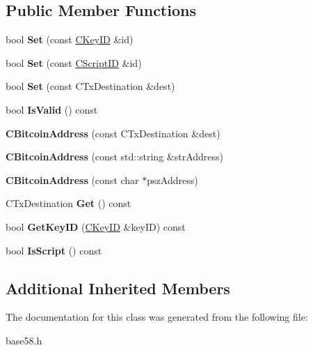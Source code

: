 \subsection*{Public Member Functions}
\begin{DoxyCompactItemize}
\item 
\mbox{\label{class_c_bitcoin_address_abe1614f9ecd143ae69256d65c5edbcab}} 
bool {\bfseries Set} (const \mbox{\hyperlink{class_c_key_i_d}{C\+Key\+ID}} \&id)
\item 
\mbox{\label{class_c_bitcoin_address_abb974c40304444b0f14a005ddb7dac03}} 
bool {\bfseries Set} (const \mbox{\hyperlink{class_c_script_i_d}{C\+Script\+ID}} \&id)
\item 
\mbox{\label{class_c_bitcoin_address_a819dfc6a4866832e2cd2e51c1a245d80}} 
bool {\bfseries Set} (const C\+Tx\+Destination \&dest)
\item 
\mbox{\label{class_c_bitcoin_address_ab39907ce6895062a8f8bf585270ef13b}} 
bool {\bfseries Is\+Valid} () const
\item 
\mbox{\label{class_c_bitcoin_address_a4c9c03791561557b8a1926567456712e}} 
{\bfseries C\+Bitcoin\+Address} (const C\+Tx\+Destination \&dest)
\item 
\mbox{\label{class_c_bitcoin_address_a23f7116fe3a89ab9a551f1d8c29469da}} 
{\bfseries C\+Bitcoin\+Address} (const std\+::string \&str\+Address)
\item 
\mbox{\label{class_c_bitcoin_address_ac0fd8d46f815948d471a8896997a3211}} 
{\bfseries C\+Bitcoin\+Address} (const char $\ast$psz\+Address)
\item 
\mbox{\label{class_c_bitcoin_address_a1e44de10dfc84d1fd2e15150f1e22b8e}} 
C\+Tx\+Destination {\bfseries Get} () const
\item 
\mbox{\label{class_c_bitcoin_address_af3d7c4547803b09144fc040320f687dd}} 
bool {\bfseries Get\+Key\+ID} (\mbox{\hyperlink{class_c_key_i_d}{C\+Key\+ID}} \&key\+ID) const
\item 
\mbox{\label{class_c_bitcoin_address_a9547fc1ef7cfc2288904e7eedab57a10}} 
bool {\bfseries Is\+Script} () const
\end{DoxyCompactItemize}
\subsection*{Additional Inherited Members}


The documentation for this class was generated from the following file\+:\begin{DoxyCompactItemize}
\item 
base58.\+h\end{DoxyCompactItemize}
